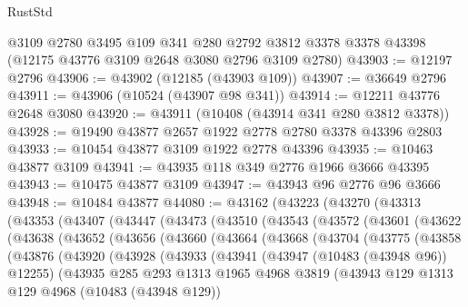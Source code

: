 \begin{lexlean}{RustStd}
\begin{coremodule}
    @3109
    @2780
    @3495
    @109
    @341
    @280
    @2792
    @3812
    @3378
    @3378
    @43398
    (@12175 @43776 @3109 @2648 @3080 @2796 @3109 @2780)
@43903 := @12197 @2796
@43906 := @43902 (@12185 (@43903 @109))
@43907 := @36649 @2796
@43911 := @43906 (@10524 (@43907 @98 @341))
@43914 := @12211 @43776 @2648 @3080
@43920 := @43911 (@10408 (@43914 @341 @280 @3812 @3378))
@43928 := @19490 @43877 @2657 @1922 @2778 @2780 @3378 @43396 @2803
@43933 := @10454 @43877 @3109 @1922 @2778 @43396
@43935 := @10463 @43877 @3109
@43941 := @43935 @118 @349 @2776 @1966 @3666 @43395
@43943 := @10475 @43877 @3109
@43947 := @43943 @96 @2776 @96 @3666
@43948 := @10484 @43877
@44080 := @43162
    (@43223
      (@43270
        (@43313
          (@43353
            (@43407
              (@43447
                (@43473
                  (@43510
                    (@43543
                      (@43572
                        (@43601
                          (@43622
                            (@43638
                              (@43652
                                (@43656
                                  (@43660
                                    (@43664
                                      (@43668
                                        (@43704
                                          (@43775
                                            (@43858
                                              (@43876
                                                (@43920
                                                  (@43928
                                                    (@43933
                                                      (@43941
                                                        (@43947 (@10483 (@43948 @96)) @12255)
                                                        (@43935
                                                          @285
                                                          @293
                                                          @1313
                                                          @1965
                                                          @4968
                                                          @3819
                                                          (@43943
                                                            @129
                                                            @1313
                                                            @129
                                                            @4968
                                                            (@10483 (@43948 @129))

\end{coremodule}
\end{lexlean}
